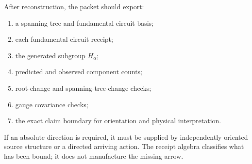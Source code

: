 After reconstruction, the packet should export:

\begin{enumerate}
\item a spanning tree and fundamental circuit basis;
\item each fundamental circuit receipt;
\item the generated subgroup $H_{\alpha}$;
\item predicted and observed component counts;
\item root-change and spanning-tree-change checks;
\item gauge covariance checks;
\item the exact claim boundary for orientation and physical interpretation.
\end{enumerate}

If an absolute direction is required, it must be supplied by independently
oriented source structure or a directed arriving action. The receipt algebra
classifies what has been bound; it does not manufacture the missing arrow.
